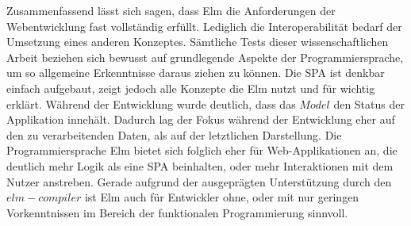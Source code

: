 Zusammenfassend lässt sich sagen, dass Elm die Anforderungen der Webentwicklung fast vollständig erfüllt. Lediglich die Interoperabilität bedarf der Umsetzung eines anderen Konzeptes.
Sämtliche Tests dieser wissenschaftlichen Arbeit beziehen sich bewusst auf grundlegende Aspekte der Programmiersprache, um so allgemeine Erkenntnisse daraus ziehen zu können. Die \ac{SPA} ist denkbar einfach aufgebaut, zeigt jedoch alle Konzepte die Elm nutzt und für wichtig erklärt. Während der Entwicklung wurde deutlich, dass das $Model$ den Status der Applikation innehält. Dadurch lag der Fokus während der Entwicklung eher auf den zu verarbeitenden Daten, als auf der letztlichen Darstellung. Die Programmiersprache Elm bietet sich folglich eher für Web-Applikationen an, die deutlich mehr Logik als eine \ac{SPA} beinhalten, oder mehr Interaktionen mit dem Nutzer anstreben. Gerade aufgrund der ausgeprägten Unterstützung durch den $elm-compiler$ ist Elm auch für Entwickler ohne, oder mit nur geringen Vorkenntnissen im Bereich der funktionalen Programmierung sinnvoll.
